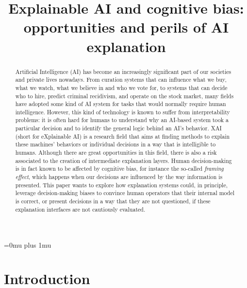 \documentclass[conference]{IEEEtran}
\begin{document}
\Urlmuskip=0mu plus 1mu

\title{Explainable AI and cognitive bias: opportunities and perils of AI explanation}


\author{
    }

\maketitle

\begin{abstract}
    Artificial Intelligence (AI) has become an increasingly significant part of
    our societies and private lives nowadays. From curation systems that can
    influence what we buy, what we watch, what we believe in and who we vote
    for, to systems that can decide who to hire, predict criminal recidivism,
    and operate on the stock market, many fields have adopted some kind of AI
    system for tasks that would normally require human intelligence. However,
    this kind of technology is known to suffer from interpretability problems:
    it is often hard for humans to understand why an AI-based system took a
    particular decision and to identify the general logic behind an AI's
    behavior. XAI (short for eXplainable AI) is a research field that aims at
    finding methods to explain these machines' behaviors or individual decisions
    in a way that is intelligible to humans. Although there are great
    opportunities in this field, there is also a risk associated to the creation
    of intermediate explanation layers. Human decision-making is in fact known
    to be affected by cognitive bias, for instance the so-called \textit{framing
        effect}, which happens when our decisions are influenced by the way
    information is presented. This paper wants to explore how explanation
    systems could, in principle, leverage decision-making biases to convince
    human operators that their internal model is correct, or present decisions
    in a way that they are not questioned, if these explanation interfaces are
    not cautiously evaluated.
\end{abstract}

\section{Introduction}
\label{sec:intro}
\end{document}
